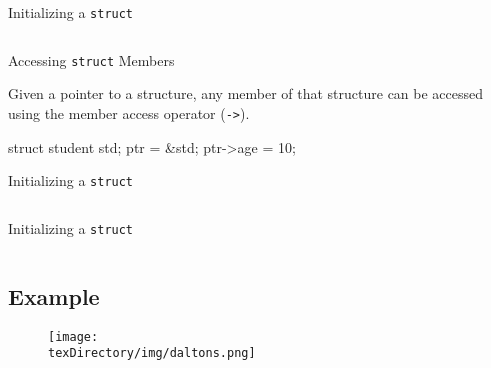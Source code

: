 \documentclass[compress]{beamer}
\begin{document}
\begin{slide}
	\begin{block}{Initializing a \texttt{struct}}

	\inputminted[fontsize=\scriptsize, firstline=10, linenos]{c}{
		\resDirectory/student1.c
	}

	\end{block}
\end{slide}

\begin{slide}
	\begin{block}{Accessing \texttt{struct} Members}

	Given a pointer to a structure, any member of that structure can be accessed using the member access operator (\texttt{->}).

	\begin{terminal}
	struct student std;
	ptr = &std;
	ptr->age = 10;
	\end{terminal}

	\end{block}
\end{slide}

\begin{slide}
	\begin{block}{Initializing a \texttt{struct}}

	\inputminted[fontsize=\scriptsize, firstline=10, lastline=20, linenos]{c}{
		\resDirectory/student2.c
	}

	\end{block}
\end{slide}

\begin{slide}
	\begin{block}{Initializing a \texttt{struct}}

	\inputminted[fontsize=\scriptsize, firstline=22, linenos]{c}{
		\resDirectory/student2.c
	}

	\end{block}
\end{slide}

\subsection{Example}

\begin{slide}
	\begin{figure}
	\texttt{[image: \\texDirectory/img/daltons.png]}
	\end{figure}
\end{slide}
\end{document}
